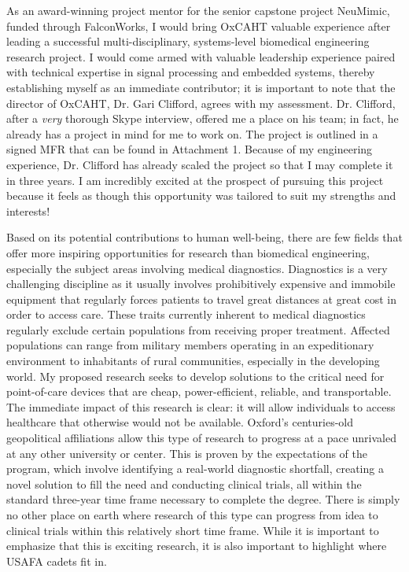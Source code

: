 \documentclass{article}
\begin{document}
As an award-winning project mentor for the senior capstone project
NeuMimic, funded through FalconWorks, I would bring OxCAHT valuable experience after leading a
successful multi-disciplinary, systems-level biomedical engineering research project. I would 
come armed with valuable leadership experience paired with technical expertise in signal 
processing and embedded systems, thereby establishing myself as an immediate contributor;
it is important to note that the director of OxCAHT, Dr. Gari Clifford, agrees
with my assessment. Dr. Clifford, after a \emph{very} thorough Skype interview,
offered me a place on his team; in fact, he already has a project in mind for me to work on. 
The project is outlined in a signed MFR that can be found in Attachment 1. 
Because of my engineering experience, Dr. Clifford has already scaled the project so that I may
complete it in three years. I am incredibly excited at the prospect of pursuing this project 
because it feels as though this opportunity was tailored to suit my strengths and interests! 
 
Based on its potential contributions to human well-being, there are few fields
that offer more inspiring opportunities for research than biomedical engineering, especially the subject areas involving medical diagnostics.
Diagnostics is a very challenging discipline as it usually involves
prohibitively expensive and immobile equipment that regularly forces patients
to travel great distances at great cost in order to access care. These traits
currently inherent to medical diagnostics regularly exclude certain
populations from receiving proper
treatment. Affected populations can range from military members operating in an
expeditionary environment to inhabitants of rural communities, especially in the developing
world. My proposed research seeks to develop solutions to the critical need for
point-of-care devices that are cheap, power-efficient, reliable, and
transportable. The immediate impact of this research is clear: it will allow
individuals to access healthcare that otherwise would not be available. Oxford's
centuries-old geopolitical affiliations allow this type of research to progress 
at a pace unrivaled at any other university or center. This is proven by the
expectations of the program, which involve identifying a real-world diagnostic 
shortfall, creating a novel solution to fill the need and conducting
clinical trials, all within the standard three-year time frame necessary to 
complete the degree. There is simply no other place on earth where research of
this type can progress from idea to clinical trials within this relatively short
time frame. While it is important to emphasize that this is exciting research,
it is also important to highlight where USAFA cadets fit in.
 
\end{document}
